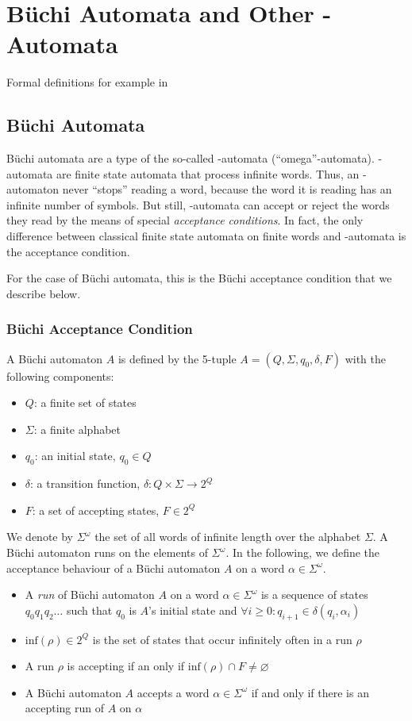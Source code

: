 \section{Büchi Automata and Other \om-Automata}

Formal definitions for example in~\cite{Thomas:1991}\cite{1996_thomas}\cite{2014_wilke}

\subsection{Büchi Automata}
\label{buchi_automata}
Büchi automata are a type of the so-called \om-automata (``omega''-automata). \om-automata are finite state automata that process infinite words. Thus, an \om-automaton never ``stops'' reading a word, because the word it is reading has an infinite number of symbols. But still, \om-automata can accept or reject the words they read by the means of special \textit{acceptance conditions}. In fact, the only difference between classical finite state automata on finite words and \om-automata is the acceptance condition. 

For the case of Büchi automata, this is the Büchi acceptance condition that we describe below.

\subsubsection{Büchi Acceptance Condition}

A Büchi automaton $A$ is defined by the 5-tuple $A = (Q, \Sigma, q_0, \delta, F)$ with the following components:
\begin{itemize}
\item $Q$: a finite set of states
\item $\Sigma$: a finite alphabet
\item $q_0$: an initial state, $q_0 \in Q$
\item $\delta$: a transition function, $\delta: Q \times \Sigma \rightarrow 2^Q$
\item $F$: a set of accepting states, $F \in 2^Q$
\end{itemize}

We denote by $\Sigma^\omega$ the set of all words of infinite length over the alphabet $\Sigma$. A Büchi automaton runs on the elements of $\Sigma^\omega$. In the following, we define the acceptance behaviour of a Büchi automaton $A$ on a word $\alpha \in \Sigma^\omega$.

\begin{itemize}
\item A \emph{run} of Büchi automaton $A$ on a word $\alpha \in \Sigma^\omega$ is a sequence of states $q_0q_1q_2\dots$ such that $q_0$ is $A$'s initial state and $\forall i \geq 0: q_{i+1} \in \delta(q_i, \alpha_i)$
\item $\textrm{inf}(\rho) \in 2^Q$ is the set of states that occur infinitely often in a run $\rho$
\item A run $\rho$ is accepting if an only if $\textrm{inf}(\rho) \cap F \neq \varnothing$
\item A Büchi automaton $A$ accepts a word $\alpha \in \Sigma^\omega$ if and only if there is an accepting run of $A$ on $\alpha$
\end{itemize}


